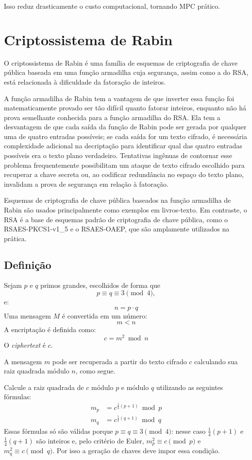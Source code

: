 \documentclass[12pt, oneside, a4paper, english, brazil]{abntex2}
\begin{document}
Isso reduz drasticamente o custo computacional, tornando MPC prático.

\section{Criptossistema de Rabin}

O criptossistema de Rabin é uma família de esquemas de criptografia de chave
pública baseada em uma função armadilha cuja segurança, assim como a do RSA,
está relacionada à dificuldade da fatoração de inteiros.

A função armadilha de Rabin tem a vantagem de que inverter essa função foi
matematicamente provado ser tão difícil quanto fatorar inteiros, enquanto não
há prova semelhante conhecida para a função armadilha do RSA. Ela tem a
desvantagem de que cada saída da função de Rabin pode ser gerada por qualquer
uma de quatro entradas possíveis; se cada saída for um texto cifrado, é
necessária complexidade adicional na decriptação para identificar qual das
quatro entradas possíveis era o texto plano verdadeiro. Tentativas ingênuas de
contornar esse problema frequentemente possibilitam um ataque de texto cifrado
escolhido para recuperar a chave secreta ou, ao codificar redundância no
espaço do texto plano, invalidam a prova de segurança em relação à fatoração.

Esquemas de criptografia de chave pública baseados na função armadilha de
Rabin são usados principalmente como exemplos em livros-texto. Em contraste, o
RSA é a base de esquemas padrão de criptografia de chave pública, como o
RSAES-PKCS1-v1\_5 e o RSAES-OAEP, que são amplamente utilizados na prática.
\cite{rabin2005}

\subsection{Definição}

Sejam $p$ e $q$ primos grandes, escolhidos de forma que
\[
p \equiv q \equiv 3 \pmod{4},
\]
e:
\[
n = p \cdot q
\]
Uma mensagem $M$ é convertida em um número:
\[
m < n
\]
A encriptação é definida como:
\[
c = m^2 \bmod n
\]
O \emph{ciphertext} é $c$.

A mensagem $m$ pode ser recuperada a partir do texto cifrado $c$ calculando
sua raiz quadrada módulo $n$, como segue.

Calcule a raiz quadrada de $c$ módulo $p$ e módulo $q$ utilizando as
seguintes fórmulas:
\begin{align*}
m_p &= c^{\frac{1}{4}(p+1)} \bmod p \\
m_q &= c^{\frac{1}{4}(q+1)} \bmod q
\end{align*}
Essas fórmulas só são válidas porque $p \equiv q \equiv 3 \pmod 4$: nesse
caso $\frac{1}{4}(p+1)$ e $\frac{1}{4}(q+1)$ são inteiros e, pelo critério de
Euler, $m_p^2 \equiv c \pmod p$ e $m_q^2 \equiv c \pmod q$. Por isso a geração
de chaves deve impor essa condição.
\end{document}
